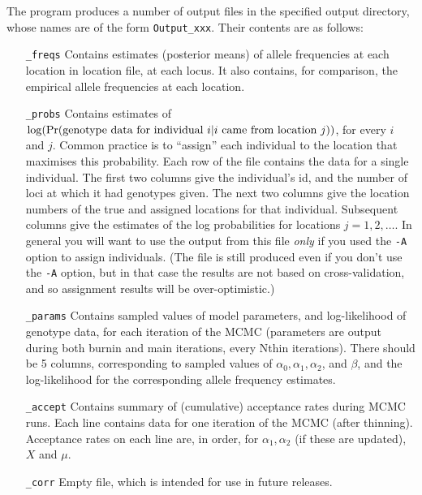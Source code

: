 \documentclass[11pt,titlepage,times,letterpaper]{article}
\def \Pr{{\rm Pr}}
\begin{document}
The program produces a number of output files in the specified output directory,
whose names are of the form {\tt Output\_xxx}. Their
contents are as follows:
\begin{enumerate}[\_params]
\item[{\tt \_freqs}] Contains estimates (posterior means) of allele
frequencies at each location in location file, at each locus. It also contains,
for comparison, the empirical allele frequencies at each location.
\item[{\tt \_probs}] Contains estimates of $\log(\Pr(\text{genotype
data for individual $i$} | \text{$i$ came from location $j$}))$, for
every $i$ and $j$. Common practice is to ``assign'' each individual
to the location that maximises this probability. Each row of the file
contains the data for a single individual. The first two columns give
the individual's id, and the number of loci at which it had genotypes
given. The next two columns give the location numbers of the
true and assigned locations for that individual.
Subsequent columns give the estimates of the log
probabilities for locations $j=1,2,\dots$. In general you will want to
use the output from this file {\it only} if you used the {\tt -A}
option to assign individuals. (The file is still produced even if you
don't use the {\tt -A} option, but in that case the results are not
based on cross-validation, and so assignment results will be
over-optimistic.)
\item[{\tt \_params}] Contains sampled values of model parameters, and
log-likelihood of genotype data, for each iteration of the MCMC
(parameters are output during both burnin and main iterations, every
Nthin iterations). There should be 5 columns, corresponding to sampled
values of $\alpha_0,\alpha_1,\alpha_2$, and $\beta$, and the
log-likelihood for the corresponding allele frequency estimates.
\item[{\tt \_accept}] Contains summary of (cumulative) acceptance rates
during MCMC runs. Each line contains data for one iteration of the
MCMC (after thinning). Acceptance rates on each line are, in order,
for $\alpha_1,\alpha_2$ (if these are updated), $X$ and $\mu$.
\item[{\tt \_corr}] Empty file, which is intended for use in future releases.
\end{enumerate}
\end{document}
